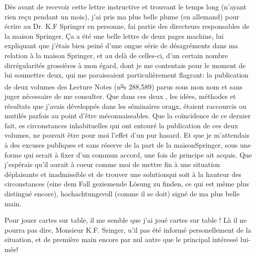 Dès avant de recevoir cette lettre instructive et trouvant le temps long (n'ayant rien reçu pendant un mois), j'ai pris ma plus belle plume (en allemand) pour écrire au Dr. K.F Springer en personne,  fai partie des directeurs responsables de la maison Springer. Ça a été une belle  lettre de deux pages machine, lui expliquant que j'étais bien peiné d'une ongue série de désagréments dans ma relation à la maison Springer, et au delà de celles-ci, d'un certain nombre dirrégularités grossières à mon égard, dont je me contentais pour le moment de lui soumettre deux, qui me paraissaient particulièrement flagrant: la publication de deux volumes des Lecture Notes (n\textsuperscript{\uline{o}}s 288,589) parus sous mon nom et sans  juger nécessaire de me consulter. Que dans ces deux , les idées, méthodes et résultats que j'avais développés dans les séminaires ora\uline{u}x, étaient raccourcis ou mutilés parfois au point d'être méconnaissables. Que la coïncidence de ce dernier fait,  es circonstances inhabituelles qui ont entouré la publication de ces deux volumes, ne pouvait être pour moi l'effet d'un pur hasard. Et que je m'attendais à des excuses publiques et sans réserve de la part de la maison\handwritten{/}Springer, sous une forme qui serait à fixer d'un commun accord, une fois  de principe ait acquis. Que j'espérais qu'il aurait à coeur comme moi de mettre fin à une situation déplaisante et inadmissible et de trouver une solutionqui soit à la hauteur des circonstances (eine dem Fall geziemende Lösung zu finden, ce qui  est même plus distingué encore), hochachtungsvoll (comme il se doit) signé de ma plus belle main.

Pour jouer cartes sur table, il me semble que j'ai joué cartes sur table ! Là il ne pourra pas dire, Monsieur K.F. Sringer, u'il  pas été informé personellement de la situation, et de première main encore\handwritten{,} par nul autre que le principal intéressé lui-mêe!

